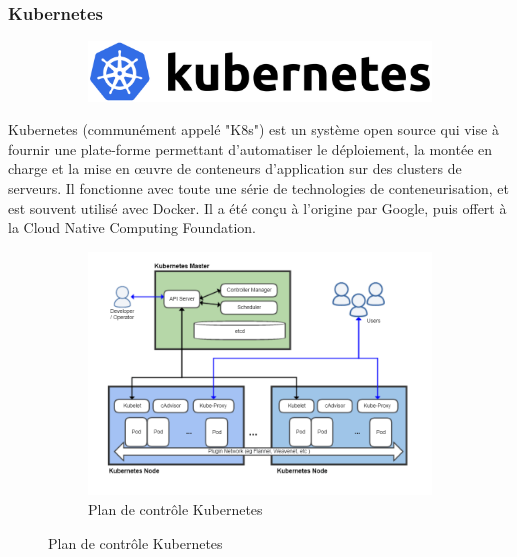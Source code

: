 \documentclass{article}
\begin{document}
\subsubsection{Kubernetes}

\begin{figure}[h!]
	\centering
  	\begin{subfigure}[b]{0.4\linewidth}
    \includegraphics[width=\linewidth]{kube.png}
  	\end{subfigure}
\end{figure}

Kubernetes (communément appelé "K8s") est un système open source qui vise à fournir une plate-forme permettant d'automatiser le déploiement, la montée en charge et la mise en œuvre de conteneurs d'application sur des clusters de serveurs. Il fonctionne avec toute une série de technologies de conteneurisation, et est souvent utilisé avec Docker. Il a été conçu à l'origine par Google, puis offert à la Cloud Native Computing Foundation. 
\newline
\begin{figure}[h!]
	\centering
  	\begin{subfigure}[b]{1.0\linewidth}
	\includegraphics[width=\linewidth]{Kubernetes.png}
	\caption{Plan de contrôle Kubernetes}
  	\end{subfigure}
\end{figure}
\end{document}
